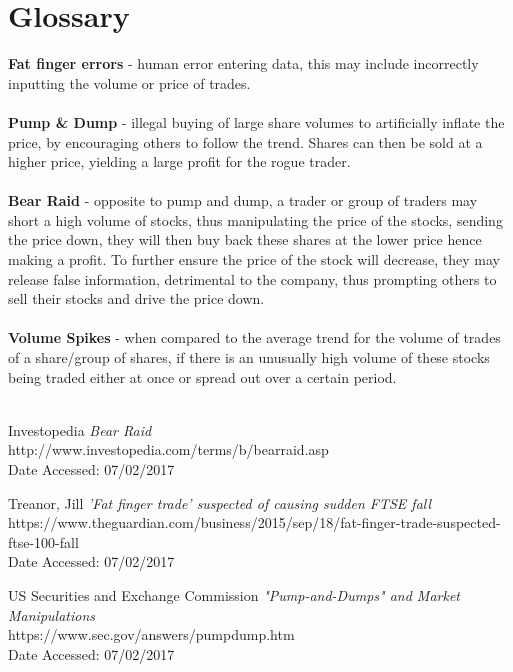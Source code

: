 \documentclass[11pt, oneside, a4paper]{article}
\begin{document}
\section{Glossary}
\textbf{Fat finger errors} - human error entering data, this may include incorrectly inputting the volume
or price of trades. \\\\
\textbf{Pump \& Dump} - illegal buying of large share volumes to artificially inflate the price, by encouraging
others to follow the trend. Shares can then be sold at a higher price, yielding a large profit for the rogue trader. \\\\
\textbf{Bear Raid} - opposite to pump and dump, a trader or group of traders may short a high volume of stocks,
thus manipulating the price of the stocks, sending the price down, they will then buy back these shares at the
lower price hence making a profit. To further ensure the price of the stock will decrease, they may release false
information, detrimental to the company, thus prompting others to sell their stocks and drive the price down. \\\\
\textbf{Volume Spikes} - when compared to the average trend for the volume of trades of a share/group of shares,
if there is an unusually high volume of these stocks being traded either at once or spread out over a certain period. \\\\

\begin{thebibliography}

	\item Investopedia {\em Bear Raid} \\
	http://www.investopedia.com/terms/b/bearraid.asp \\
	Date Accessed: 07/02/2017
	\item Treanor, Jill {\em 'Fat finger trade' suspected of causing sudden FTSE fall} \\
	https://www.theguardian.com/business/2015/sep/18/fat-finger-trade-suspected-ftse-100-fall \\
	Date Accessed: 07/02/2017
	\item US Securities and Exchange Commission {\em "Pump-and-Dumps" and Market Manipulations} \\
	https://www.sec.gov/answers/pumpdump.htm \\
	Date Accessed: 07/02/2017
\end{thebibliography}
\end{document}

